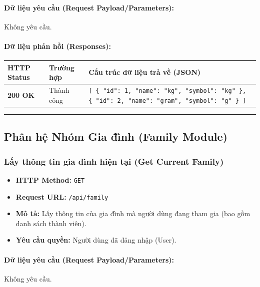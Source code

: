 \documentclass[12pt,a4paper]{article}
\begin{document}
\paragraph{Dữ liệu yêu cầu (Request Payload/Parameters):}
Không yêu cầu.\\

\paragraph{Dữ liệu phản hồi (Responses):}
\begin{longtable}{|p{2.8cm}|p{3.2cm}|p{8.0cm}|}
\hline
\textbf{HTTP Status} & \textbf{Trường hợp} & \textbf{Cấu trúc dữ liệu trả về (JSON)} \\ \hline
\endhead
\textbf{200 OK} & Thành công & \texttt{[ \{ "id": 1, "name": "kg", "symbol": "kg" \}, \{ "id": 2, "name": "gram", "symbol": "g" \} ]} \\ \hline
\end{longtable}

\vskip 0.4cm
\noindent\rule{\textwidth}{0.3pt}
\vskip 0.4cm

\subsection{Phân hệ Nhóm Gia đình (Family Module)}

\subsubsection{Lấy thông tin gia đình hiện tại (Get Current Family)}
\begin{itemize}[leftmargin=*]
    \item \textbf{HTTP Method:} \texttt{GET}
    \item \textbf{Request URL:} \texttt{/api/family}
    \item \textbf{Mô tả:} Lấy thông tin của gia đình mà người dùng đang tham gia (bao gồm danh sách thành viên).
    \item \textbf{Yêu cầu quyền:} Người dùng đã đăng nhập (User).
\end{itemize}

\paragraph{Dữ liệu yêu cầu (Request Payload/Parameters):}
Không yêu cầu.\\
\end{document}
